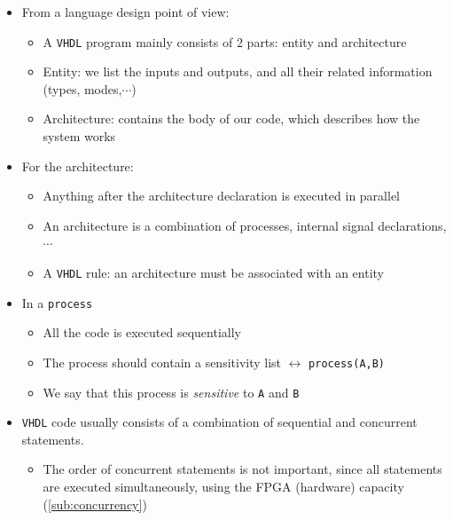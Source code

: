 \begin{itemize}

\item From a language design point of view:

	\begin{itemize}
	
	\item A \verb|VHDL| program mainly consists of 2 parts: entity and architecture
	
	\item Entity: we list the inputs and outputs, and all their related information (types, modes,$\cdots$)
	
	\item Architecture: contains the body of our code, which describes how the system works 
			
	\end{itemize}

\item For the architecture:

 \begin{itemize}
	
 \item Anything after the architecture declaration is executed in parallel 		

 \item An architecture is a combination of processes, internal signal declarations, $\cdots$ 
 
 \item A \verb|VHDL| rule: an architecture must be associated with an entity

 \end{itemize}

\item In a \verb|process|

	\begin{itemize}
	\item All the code is executed sequentially 
	
	\item The process should contain a sensitivity list $\leftrightarrow$ \verb|process(A,B)|
	
	\item We say that this process is \textit{sensitive} to \verb|A| and \verb|B|
	\end{itemize}


\item \verb|VHDL| code usually consists of a combination of sequential and concurrent statements.

	\begin{itemize}
	\item The order of concurrent statements is not important, since all statements are executed simultaneously, using the FPGA (hardware) capacity (\ref{sub:concurrency})
	\end{itemize}



\end{itemize}





